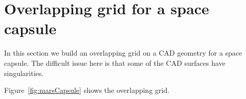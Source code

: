 \section{Overlapping grid for a space capsule}\label{sec:marsCapsule}


In this section we build an overlapping grid on a CAD geometry for 
a space capsule. The difficult issue here is that some of the CAD
surfaces have singularities.

Figure~\ref{fig:marsCapsule} shows the overlapping grid.




